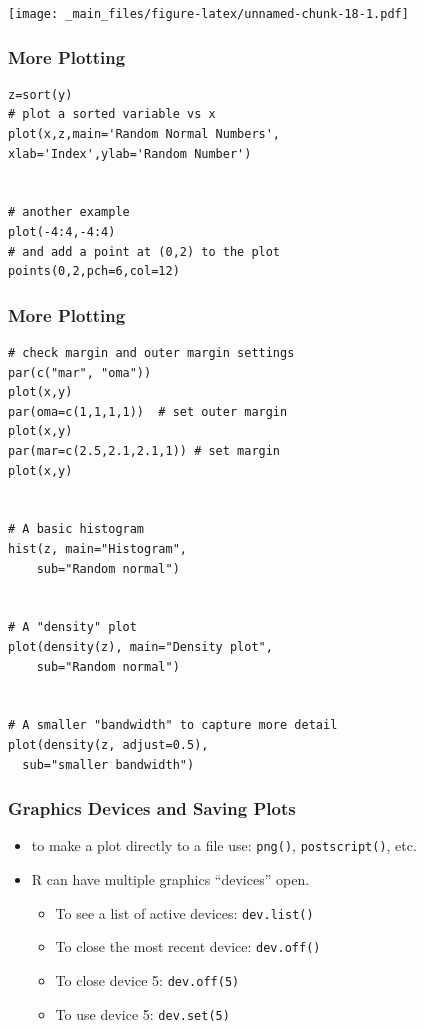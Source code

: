 \documentclass[]{article}
\theoremstyle{definition}
\theoremstyle{definition}
\theoremstyle{remark}
\begin{document}
\texttt{[image: \_main\_files/figure-latex/unnamed-chunk-18-1.pdf]}

\subsubsection{More Plotting}\label{more-plotting}

\begin{verbatim}
z=sort(y)
# plot a sorted variable vs x
plot(x,z,main='Random Normal Numbers',
xlab='Index',ylab='Random Number')


# another example
plot(-4:4,-4:4) 
# and add a point at (0,2) to the plot
points(0,2,pch=6,col=12)
\end{verbatim}

\subsubsection{More Plotting}\label{more-plotting-1}

\begin{verbatim}
# check margin and outer margin settings
par(c("mar", "oma")) 
plot(x,y)
par(oma=c(1,1,1,1))  # set outer margin
plot(x,y)
par(mar=c(2.5,2.1,2.1,1)) # set margin
plot(x,y)


# A basic histogram
hist(z, main="Histogram",
    sub="Random normal")


# A "density" plot
plot(density(z), main="Density plot",
    sub="Random normal")


# A smaller "bandwidth" to capture more detail
plot(density(z, adjust=0.5),
  sub="smaller bandwidth")
\end{verbatim}

\subsubsection{Graphics Devices and Saving
Plots}\label{graphics-devices-and-saving-plots}

\begin{itemize}
\item
  {to make a plot directly to a file use: \texttt{png()},
  \texttt{postscript()}, etc.}
\item
  {R can have multiple graphics ``devices'' open.}

  \begin{itemize}
  \item
    {To see a list of active devices: \texttt{dev.list()}}
  \item
    {To close the most recent device: \texttt{dev.off()}}
  \item
    {To close device 5: \texttt{dev.off(5)}}
  \item
    {To use device 5: \texttt{dev.set(5)}}
  \end{itemize}
\end{itemize}
\end{document}
